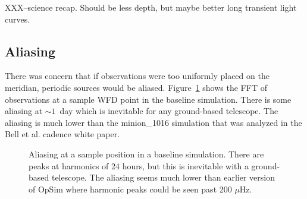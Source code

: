 XXX--science recap. Should be less depth, but maybe better long transient light curves.

\subsection{Aliasing}

There was concern that if observations were too uniformly placed on the meridian, periodic sources would be aliased. Figure~\ref{fig:alias} shows the FFT of observations at a sample WFD point in the baseline simulation. There is some aliasing at $\sim1$\ day which is inevitable for any ground-based telescope.  The aliasing is much lower than the minion\_1016 simulation that was analyzed in the Bell et al. cadence white paper. 

\begin{figure}
\caption{Aliasing at a sample position in a baseline simulation. There are peaks at harmonics of 24 hours, but this is inevitable with a ground-based telescope. The aliasing seems much lower than earlier version of OpSim where harmonic peaks could be seen past 200 $\mu$Hz.}\label{fig:alias}
\end{figure}